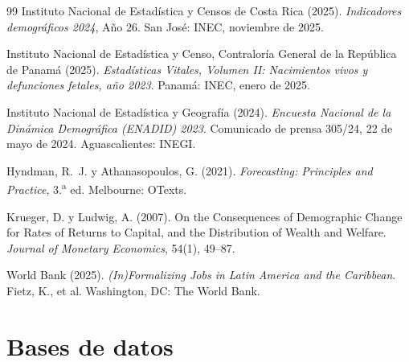\documentclass[12pt, letterpaper]{article}
\begin{document}
\begin{thebibliography}{99}
 Instituto Nacional de Estadística y
Censos de Costa Rica (2025). \textit{Indicadores demográficos 2024}, Año 26. San
José: INEC, noviembre de 2025.

 Instituto Nacional de Estadística y Censo,
Contraloría General de la República de Panamá (2025). \textit{Estadísticas Vitales,
Volumen II: Nacimientos vivos y defunciones fetales, año 2023}. Panamá: INEC, enero
de 2025.

 Instituto Nacional de Estadística y Geografía
(2024). \textit{Encuesta Nacional de la Dinámica Demográfica (ENADID) 2023}.
Comunicado de prensa 305/24, 22 de mayo de 2024. Aguascalientes: INEGI.

 Hyndman, R.~J. y
Athanasopoulos, G. (2021). \textit{Forecasting: Principles and Practice},
3.\textsuperscript{a} ed. Melbourne: OTexts.

 Krueger, D. y Ludwig, A. (2007). On
the Consequences of Demographic Change for Rates of Returns to Capital, and the
Distribution of Wealth and Welfare. \textit{Journal of Monetary Economics}, 54(1),
49--87.

 World Bank (2025). \textit{(In)Formalizing Jobs in Latin America
and the Caribbean}. Fietz, K., et al. Washington, DC: The World Bank.

\end{thebibliography}

\section*{Bases de datos}
\end{document}
